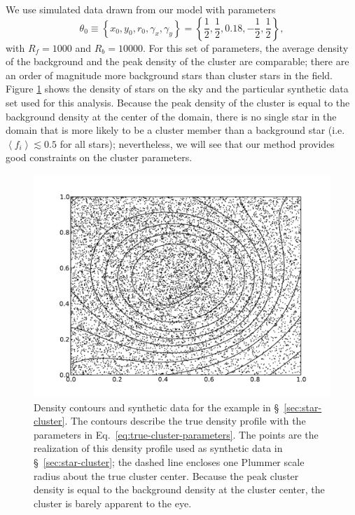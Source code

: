 \documentclass[aps,prd,reprint,nofootinbib]{revtex4-1}
\begin{document}
We use simulated data drawn from our model with parameters
\begin{equation}
\label{eq:true-cluster-parameters}
\theta_0 \equiv \left\{ x_0, y_0, r_0, \gamma_x, \gamma_y \right\} =
\left\{ \frac{1}{2}, \frac{1}{2}, 0.18, -\frac{1}{2}, \frac{1}{2}
\right\},
\end{equation}
with $R_f = 1000$ and $R_b = 10000$.  For this set of parameters, the
average density of the background and the peak density of the cluster
are comparable; there are an order of magnitude more background stars
than cluster stars in the field.  Figure \ref{fig:sky-density} shows
the density of stars on the sky and the particular synthetic data set
used for this analysis.  Because the peak density of the cluster is
equal to the background density at the center of the domain, there is
no single star in the domain that is more likely to be a cluster
member than a background star (i.e.\ $\left \langle f_i \right \rangle
\lesssim 0.5$ for all stars); nevertheless, we will see that our
method provides good constraints on the cluster parameters.

\begin{figure}
  \includegraphics[width=\columnwidth]{cluster-density}
  \caption{\label{fig:sky-density} Density contours and synthetic data
    for the example in \S~\ref{sec:star-cluster}.  The contours
    describe the true density profile with the parameters in
    Eq.~\eqref{eq:true-cluster-parameters}.  The points are the
    realization of this density profile used as synthetic data in
    \S~\ref{sec:star-cluster}; the dashed line encloses one Plummer
    scale radius about the true cluster center.  Because the peak
    cluster density is equal to the background density at the cluster
    center, the cluster is barely apparent to the eye.}
\end{figure}
\end{document}
